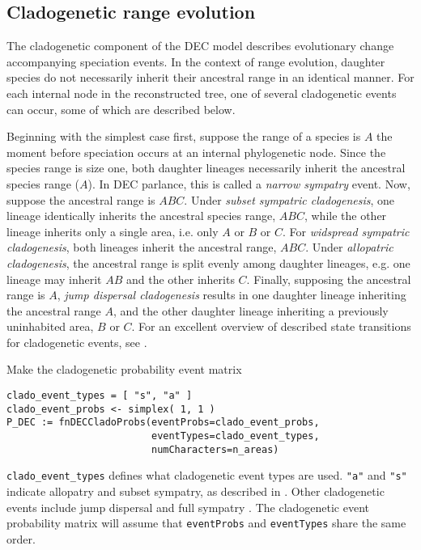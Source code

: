 \subsection*{Cladogenetic range evolution}

The cladogenetic component of the DEC model describes evolutionary change accompanying speciation events.
In the context of range evolution, daughter species do not necessarily inherit their ancestral range in an identical manner.
For each internal node in the reconstructed tree, one of several cladogenetic events can occur, some of which are described below.

Beginning with the simplest case first, suppose the range of a species is $A$ the moment before speciation occurs at an internal phylogenetic node.
Since the species range is size one, both daughter lineages necessarily inherit the ancestral species range ($A$).
In DEC parlance, this is called a {\it narrow sympatry} event.
Now, suppose the ancestral range is $ABC$.
Under {\it subset sympatric cladogenesis}, one lineage identically inherits the ancestral species range, $ABC$, while the other lineage inherits only a single area, i.e. only $A$ or $B$ or $C$.
For {\it widspread sympatric cladogenesis}, both lineages inherit the ancestral range, $ABC$.
Under {\it allopatric cladogenesis}, the ancestral range is split evenly among daughter lineages, e.g. one lineage may inherit $AB$ and the other inherits $C$.
Finally, supposing the ancestral range is $A$, {\it jump dispersal cladogenesis}  results in one daughter lineage inheriting the ancestral range $A$, and the other daughter lineage inheriting a previously uninhabited area, $B$ or $C$.
For an excellent overview of described state transitions for cladogenetic events, see \citet{Matzke2012}.

Make the cladogenetic probability event matrix

\begin{snugshade}
\begin{lstlisting}
clado_event_types = [ "s", "a" ]
clado_event_probs <- simplex( 1, 1 )
P_DEC := fnDECCladoProbs(eventProbs=clado_event_probs,
                         eventTypes=clado_event_types,
                         numCharacters=n_areas)
\end{lstlisting}
\end{snugshade}

{\tt clado\_event\_types} defines what cladogenetic event types are used.
{\tt "a"} and {\tt "s"} indicate allopatry and subset sympatry, as described in \citep{ree05}.
Other cladogenetic events include jump dispersal \citep[{\tt "j"};][]{Matzke2012} and full sympatry \citep[{\tt "f"};][]{Landis2013}.
The cladogenetic event probability matrix will assume that {\tt eventProbs} and {\tt eventTypes} share the same order.

